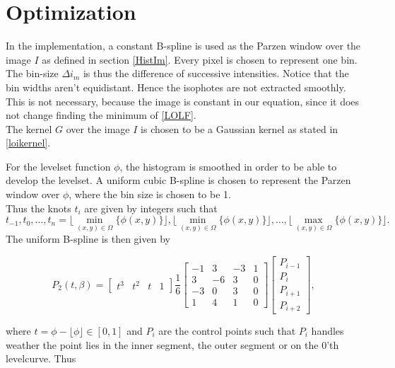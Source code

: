 \section{Optimization}\label{section:OLopt}
In the implementation, a constant B-spline is used as the Parzen window over the image $I$ as defined in section \ref{HistIm}. Every pixel is chosen to represent one bin. The bin-size $\Delta i_m$ is thus the difference of successive intensities. Notice that the bin widths aren't equidistant. Hence the isophotes are not extracted smoothly. This is not necessary, because the image is constant in our equation, since it does not change finding the minimum of \eqref{LOLF}.\\
The kernel $G$ over the image $I$ is chosen to be a Gaussian kernel as stated in \eqref{loikernel}. 

For the levelset function $\phi$, the histogram is smoothed in order to be able to develop the levelset. A uniform cubic B-spline is chosen to represent the Parzen window over $\phi$, where the bin size is chosen to be 1.\\
Thus the knots $t_i$ are given by integers such that
\[
t_{-1},t_0,\dots,t_n = \lfloor\min_{(x,y)\in\Omega}\{\phi(x,y)\}\rfloor, \lfloor\min_{(x,y)\in\Omega}\{\phi(x,y)\}\rfloor, \dots, \lfloor\max_{(x,y)\in\Omega}\{\phi(x,y)\}\rfloor.
\]
The uniform B-spline is then given by

\begin{equation}
  P_2(t,\beta) = 
  \begin{bmatrix} t^3 & t^2 & t & 1 \end{bmatrix} 
  \frac{1}{6} 
  \begin{bmatrix}
    -1 &  3 & -3 & 1 \\
    3 & -6 &  3 & 0 \\
    -3 &  0 &  3 & 0 \\
    1 &  4 &  1 & 0 
  \end{bmatrix}
  \left[\begin{array}{l} 
      P_{i-1} \\
      P_{i} \\
      P_{i+1} \\
      P_{i+2}
    \end{array}\right],
\end{equation}

where $t = \phi-\lfloor \phi\rfloor \in [0,1]$ and $P_i$ are the control points such that $P_i$ handles weather the point lies in the inner segment, the outer segment or on the 0'th levelcurve. Thus

